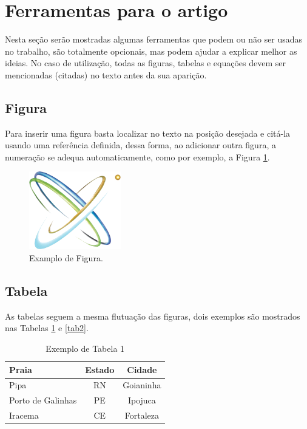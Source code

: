 \documentclass[conference]{ModeloA}
\begin{document}
\section{Ferramentas para o artigo}

Nesta seção serão mostradas algumas ferramentas que podem ou não ser usadas no trabalho, são totalmente opcionais, mas podem ajudar a explicar melhor as ideias. No caso de utilização, todas as figuras, tabelas e equações devem ser mencionadas (citadas) no texto antes da sua aparição.

\subsection{Figura}
Para inserir uma figura basta localizar no texto na posição desejada e citá-la usando uma referência definida, dessa forma, ao adicionar outra figura, a numeração se adequa automaticamente, como por exemplo, a Figura \ref{ect}.

\begin{figure}[htbp]
	\centerline{\includegraphics[width=4cm]{ECT.png}}
	\caption{Examplo de Figura.}
	\label{ect}
\end{figure}

\subsection{Tabela}

As tabelas seguem a mesma flutuação das figuras, dois exemplos são mostrados nas Tabelas \ref{tab1} e \ref{tab2}.

\begin{table}[htbp]
	\caption{Exemplo de Tabela 1}
	\begin{center}
		\begin{tabular}{|l|c|c|}
			\hline
			\textbf{Praia} & \textbf{Estado} & \textbf{Cidade} \\ \hline
			Pipa & RN & Goianinha \\
			Porto de Galinhas & PE & Ipojuca\\
			Iracema & CE & Fortaleza\\
			\hline 
		\end{tabular}
		\label{tab1}
	\end{center}
\end{table}
\end{document}
